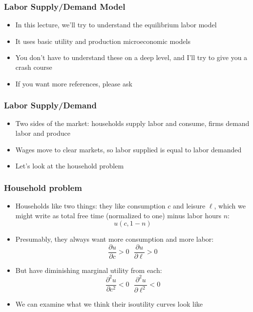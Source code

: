 \documentclass{beamer}
\author{Trevor S. Gallen}
\date{}
\begin{document}
\begin{frame}
\titlepage
\end{frame}

\begin{frame}
\frametitle[alignment=center]{Labor Supply/Demand Model}
\begin{itemize}
\item In this lecture, we'll try to understand the equilibrium labor model
\bigskip
\item It uses basic utility and production microeconomic models
\bigskip
\item You don't have to understand these on a deep level, and I'll try to give you a crash course
\bigskip
\item If you want more references, please ask
\end{itemize}
\end{frame}

\begin{frame}
\frametitle[alignment=center]{Labor Supply/Demand}
\begin{itemize}
\item Two sides of the market:  households supply labor and consume, firms demand labor and produce
\bigskip
\item Wages move to clear markets, so labor supplied is equal to labor demanded
\bigskip
\item Let's look at the household problem
\end{itemize}
\end{frame}

\begin{frame}
\frametitle[alignment=center]{Household problem}
\begin{itemize}
\item Households like two things:  they like consumption $c$ and leisure $\ell$, which we might write as total free time (normalized to one) minus labor hours $n$:
$$u(c,1-n)$$
\item Presumably, they always want more consumption and more labor:
$$\frac{\partial u}{\partial c}>0\ \ \ \frac{\partial u}{\partial \ell}>0$$
\item But have diminishing marginal utility from each:
$$\frac{\partial^2 u}{\partial c^2}<0\ \ \ \frac{\partial^2 u}{\partial \ell^2}<0$$
\item We can examine what we think their isoutility curves look like
\end{itemize}
\end{frame}
\end{document}
